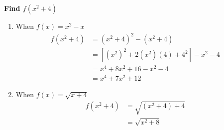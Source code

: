 \documentclass[crop=false,fleqn]{standalone}
\begin{document}
    \textbf{Find $f(x^2+4)$}

    \begin{enumerate}
        \item When $f(x) = x^2 - x$
        \begin{align*}
            f(x^2+4) &= (x^2+4)^2 - (x^2+4) \\
                &= \left[(x^2)^2 + 2(x^2)(4) + 4^2\right] - x^2 - 4 \\
                &= x^4 + 8x^2+ 16 - x^2 -4 \\
                &= x^4+7x^2+12
        \end{align*}

        \item When $f(x) = \sqrt{x + 4}$
        \begin{align*}
            f(x^2+4) &= \sqrt{(x^2+4) + 4}\\
                &= \sqrt{x^2+8}
        \end{align*}
    \end{enumerate}
\end{document}
